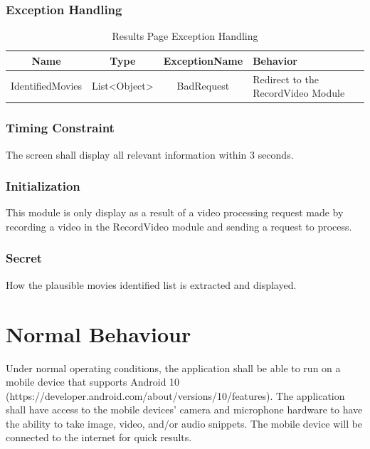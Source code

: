 \documentclass{article}
\begin{document}
\subsubsection{Exception Handling}
\begin{table}[H]
    \centering
    \begin{tabularx}{0.7\textwidth}{|c|c|c|X|} \hline
        \textbf{Name} & \textbf{Type} & \textbf{ExceptionName} & \textbf{Behavior} \\ \hline
        IdentifiedMovies & List<Object> & BadRequest & Redirect to the RecordVideo Module \\ \hline
    \end{tabularx}
    \caption{Results Page Exception Handling}
    \label{tab:Results_Page_Exception}
\end{table}

\subsubsection{Timing Constraint}
The screen shall display all relevant information within 3 seconds.

\subsubsection{Initialization}
This module is only display as a result of a video processing request made by recording a video in the RecordVideo module and sending a request to process.

\subsubsection{Secret}
How the plausible movies identified list is extracted and displayed.


\section{Normal Behaviour}
Under normal operating conditions, the application shall be able to run on a mobile device that supports Android 10 (https://developer.android.com/about/versions/10/features). The application shall have access to the mobile devices’ camera and microphone hardware to have the ability to take image, video, and/or audio snippets. The mobile device will be connected to the internet for quick results. 
\end{document}
